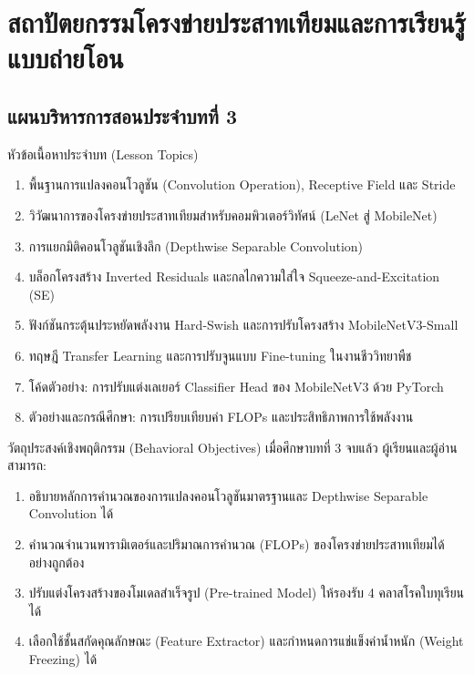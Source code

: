 \chapter{สถาปัตยกรรมโครงข่ายประสาทเทียมและการเรียนรู้แบบถ่ายโอน}
\label{chap:cnn_mobilenet}

\section*{แผนบริหารการสอนประจำบทที่ 3}

\begin{planbox}{หัวข้อเนื้อหาประจำบท (Lesson Topics)}
\begin{enumerate}[leftmargin=1.5em, itemsep=2pt]
    \item พื้นฐานการแปลงคอนโวลูชัน (Convolution Operation), Receptive Field และ Stride
    \item วิวัฒนาการของโครงข่ายประสาทเทียมสำหรับคอมพิวเตอร์วิทัศน์ (LeNet สู่ MobileNet)
    \item การแยกมิติคอนโวลูชันเชิงลึก (Depthwise Separable Convolution)
    \item บล็อกโครงสร้าง Inverted Residuals และกลไกความใส่ใจ Squeeze-and-Excitation (SE)
    \item ฟังก์ชันกระตุ้นประหยัดพลังงาน Hard-Swish และการปรับโครงสร้าง MobileNetV3-Small
    \item ทฤษฎี Transfer Learning และการปรับจูนแบบ Fine-tuning ในงานชีววิทยาพืช
    \item โค้ดตัวอย่าง: การปรับแต่งเลเยอร์ Classifier Head ของ MobileNetV3 ด้วย PyTorch
    \item ตัวอย่างและกรณีศึกษา: การเปรียบเทียบค่า FLOPs และประสิทธิภาพการใช้พลังงาน
\end{enumerate}
\end{planbox}

\begin{planbox}{วัตถุประสงค์เชิงพฤติกรรม (Behavioral Objectives)}
เมื่อศึกษาบทที่ 3 จบแล้ว ผู้เรียนและผู้อ่านสามารถ:
\begin{enumerate}[leftmargin=1.5em, itemsep=2pt]
    \item อธิบายหลักการคำนวณของการแปลงคอนโวลูชันมาตรฐานและ Depthwise Separable Convolution ได้
    \item คำนวณจำนวนพารามิเตอร์และปริมาณการคำนวณ (FLOPs) ของโครงข่ายประสาทเทียมได้อย่างถูกต้อง
    \item ปรับแต่งโครงสร้างของโมเดลสำเร็จรูป (Pre-trained Model) ให้รองรับ 4 คลาสโรคใบทุเรียนได้
    \item เลือกใช้ชั้นสกัดคุณลักษณะ (Feature Extractor) และกำหนดการแช่แข็งค่าน้ำหนัก (Weight Freezing) ได้
\end{enumerate}
\end{planbox}


